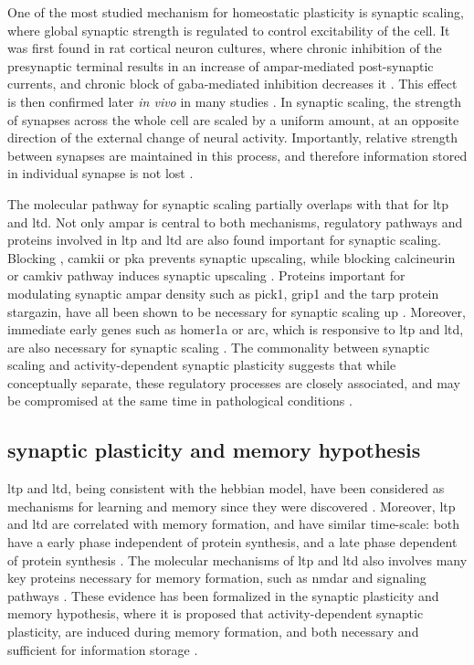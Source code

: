 One of the most studied mechanism for homeostatic plasticity is synaptic scaling, where global synaptic strength is regulated to control excitability of the cell. It was first found in rat cortical neuron cultures, where chronic inhibition of the presynaptic terminal results in an increase of \gls{ampar}-mediated post-synaptic currents, and chronic block of \gls{gaba}-mediated inhibition decreases it \citep{turrigiano98}. This effect is then confirmed later \textit{in vivo} in many studies \citep{whitt14}. In synaptic scaling, the strength of synapses across the whole cell are scaled by a uniform amount, at an opposite direction of the external change of neural activity. Importantly, relative strength between synapses are maintained in this process, and therefore information stored in individual synapse is not lost \citep{turrigiano08}. 

The molecular pathway for synaptic scaling partially overlaps with that for \gls{ltp} and \gls{ltd}. Not only \gls{ampar} is central to both mechanisms, regulatory pathways and proteins involved in \gls{ltp} and \gls{ltd} are also found important for synaptic scaling. Blocking , \gls{camkii} or \gls{pka} prevents synaptic upscaling, while blocking calcineurin or \gls{camkiv} pathway induces synaptic upscaling \citep{goel11, kim14, ibata08}. Proteins important for modulating synaptic \gls{ampar} density such as \gls{pick1}, \gls{grip1} and the \gls{tarp} protein stargazin, have all been shown to be necessary for synaptic scaling up \citep{anggono11, gainey15, louros14}. Moreover, immediate early genes such as homer1a or \gls{arc}, which is responsive to \gls{ltp} and \gls{ltd}, are also necessary for synaptic scaling \citep{hu10, gao10}. The commonality between synaptic scaling and activity-dependent synaptic plasticity suggests that while conceptually separate, these regulatory processes are closely associated, and may be compromised at the same time in pathological conditions \citep{fernandes16}.

\subsection{synaptic plasticity and memory hypothesis}
\Gls{ltp} and \gls{ltd}, being consistent with the hebbian model, have been considered as mechanisms for learning and memory since they were discovered \citep{morris90, bliss93, shors97, martin00}. Moreover, \gls{ltp} and \gls{ltd} are correlated with memory formation, and have similar time-scale: both have a early phase independent of protein synthesis, and a late phase dependent of protein synthesis \citep{abel01, reymann07}. The molecular mechanisms of \gls{ltp} and \gls{ltd} also involves many key proteins necessary for memory formation, such as \gls{nmdar} and  signaling pathways \citep{martin00}. These evidence has been formalized in the synaptic plasticity and memory hypothesis, where it is proposed that activity-dependent synaptic plasticity, are induced during memory formation, and both necessary and sufficient for information storage \citep{martin00}.  

